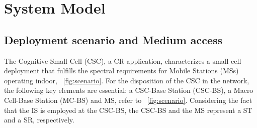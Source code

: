  
\section{System Model} \label{sec:sys_mod}
\subsection{Deployment scenario and Medium access}

The Cognitive Small Cell (CSC), a CR application, characterizes a small cell deployment that fulfills the spectral requirements for Mobile Stations (MSs) operating indoor,  \figurename~\ref{fig:scenario}. For the disposition of the CSC in the network, the following key elements are essential: a CSC-Base Station (CSC-BS), a Macro Cell-Base Station (MC-BS) and MS, refer to \figurename~\ref{fig:scenario}. 
Considering the fact that the IS is employed at the CSC-BS, the CSC-BS and the MS represent a ST and a SR, respectively. %

